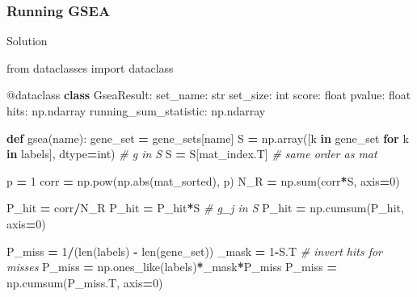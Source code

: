 \documentclass[
]{book}
\newenvironment{Shaded}{\begin{snugshade}}{\end{snugshade}}
\newcommand{\AttributeTok}[1]{\textcolor[rgb]{0.13,0.29,0.53}{#1}}
\newcommand{\BuiltInTok}[1]{#1}
\newcommand{\CommentTok}[1]{\textcolor[rgb]{0.56,0.35,0.01}{\textit{#1}}}
\newcommand{\ControlFlowTok}[1]{\textcolor[rgb]{0.13,0.29,0.53}{\textbf{#1}}}
\newcommand{\DecValTok}[1]{\textcolor[rgb]{0.00,0.00,0.81}{#1}}
\newcommand{\ImportTok}[1]{#1}
\newcommand{\KeywordTok}[1]{\textcolor[rgb]{0.13,0.29,0.53}{\textbf{#1}}}
\newcommand{\NormalTok}[1]{#1}
\newcommand{\OperatorTok}[1]{\textcolor[rgb]{0.81,0.36,0.00}{\textbf{#1}}}
\begin{document}
\subsubsection{Running GSEA}\label{running-gsea}

Solution

\begin{Shaded}
\begin{Highlighting}[numbers=left,,]
\ImportTok{from}\NormalTok{ dataclasses }\ImportTok{import}\NormalTok{ dataclass}

\AttributeTok{@dataclass}
\KeywordTok{class}\NormalTok{ GseaResult:}
\NormalTok{    set\_name: }\BuiltInTok{str}
\NormalTok{    set\_size: }\BuiltInTok{int}
\NormalTok{    score: }\BuiltInTok{float}
\NormalTok{    pvalue: }\BuiltInTok{float}
\NormalTok{    hits: np.ndarray}
\NormalTok{    running\_sum\_statistic: np.ndarray}
    
\KeywordTok{def}\NormalTok{ gsea(name):}
\NormalTok{    gene\_set }\OperatorTok{=}\NormalTok{ gene\_sets[name]}
\NormalTok{    S }\OperatorTok{=}\NormalTok{ np.array([k }\KeywordTok{in}\NormalTok{ gene\_set }\ControlFlowTok{for}\NormalTok{ k }\KeywordTok{in}\NormalTok{ labels], dtype}\OperatorTok{=}\BuiltInTok{int}\NormalTok{) }\CommentTok{\# g in S}
\NormalTok{    S }\OperatorTok{=}\NormalTok{ S[mat\_index.T] }\CommentTok{\# same order as mat}

\NormalTok{    p }\OperatorTok{=} \DecValTok{1}
\NormalTok{    corr }\OperatorTok{=}\NormalTok{ np.}\BuiltInTok{pow}\NormalTok{(np.}\BuiltInTok{abs}\NormalTok{(mat\_sorted), p)}
\NormalTok{    N\_R }\OperatorTok{=}\NormalTok{ np.}\BuiltInTok{sum}\NormalTok{(corr}\OperatorTok{*}\NormalTok{S, axis}\OperatorTok{=}\DecValTok{0}\NormalTok{)}

\NormalTok{    P\_hit }\OperatorTok{=}\NormalTok{ corr}\OperatorTok{/}\NormalTok{N\_R}
\NormalTok{    P\_hit }\OperatorTok{=}\NormalTok{ P\_hit}\OperatorTok{*}\NormalTok{S }\CommentTok{\# g\_j in S}
\NormalTok{    P\_hit }\OperatorTok{=}\NormalTok{ np.cumsum(P\_hit, axis}\OperatorTok{=}\DecValTok{0}\NormalTok{)}

\NormalTok{    P\_miss }\OperatorTok{=} \DecValTok{1}\OperatorTok{/}\NormalTok{(}\BuiltInTok{len}\NormalTok{(labels) }\OperatorTok{{-}} \BuiltInTok{len}\NormalTok{(gene\_set))}
\NormalTok{    \_mask }\OperatorTok{=} \DecValTok{1}\OperatorTok{{-}}\NormalTok{S.T }\CommentTok{\# invert hits for misses}
\NormalTok{    P\_miss }\OperatorTok{=}\NormalTok{ np.ones\_like(labels)}\OperatorTok{*}\NormalTok{\_mask}\OperatorTok{*}\NormalTok{P\_miss}
\NormalTok{    P\_miss }\OperatorTok{=}\NormalTok{ np.cumsum(P\_miss.T, axis}\OperatorTok{=}\DecValTok{0}\NormalTok{)}


\end{Highlighting}
\end{Shaded}
\end{document}
